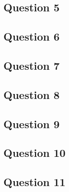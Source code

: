 \documentclass{article}
\begin{document}
\subsection*{Question 5}
\subsection*{Question 6}
\subsection*{Question 7}
\subsection*{Question 8}
\subsection*{Question 9}
\subsection*{Question 10}
\subsection*{Question 11}
\end{document}
